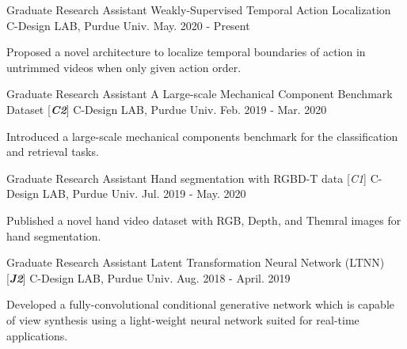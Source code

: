 

\begin{cventries}

\cventry
{Graduate Research Assistant} %
{Weakly-Supervised Temporal Action Localization} %
{C-Design LAB, Purdue Univ.} %
{May. 2020 - Present} %
{ %
\begin{cvitems}
\item {Proposed a novel architecture to localize temporal boundaries of action in untrimmed videos when only given action order.}
\end{cvitems}
}

\cventry
{Graduate Research Assistant} %
{A Large-scale Mechanical Component Benchmark Dataset [\textit{\textbf{C2}}]} %
{C-Design LAB, Purdue Univ.} %
{Feb. 2019 - Mar. 2020} %
{ %
\begin{cvitems}
\item {Introduced a large-scale mechanical components benchmark for the classification and retrieval tasks.}
\end{cvitems}
}

\cventry
{Graduate Research Assistant} %
{Hand segmentation with RGBD-T data [\textit{\textit{C1}}]} %
{C-Design LAB, Purdue Univ.} %
{Jul. 2019 - May. 2020} %
{ %
\begin{cvitems}
\item {Published a novel hand video dataset with RGB, Depth, and Themral images for hand segmentation.}
\end{cvitems}
}


\cventry
{Graduate Research Assistant} %
{Latent Transformation Neural Network (LTNN) [\textit{\textbf{J2}}]} %
{C-Design LAB, Purdue Univ.} %
{Aug. 2018 - April. 2019} %
{ %
\begin{cvitems}
\item {Developed a fully-convolutional conditional generative network which is capable of view synthesis using a light-weight neural network suited for real-time applications.}
\end{cvitems}
}


\end{cventries}
